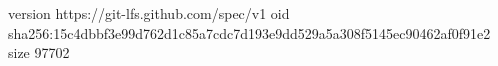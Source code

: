 version https://git-lfs.github.com/spec/v1
oid sha256:15c4dbbf3e99d762d1c85a7cdc7d193e9dd529a5a308f5145ec90462af0f91e2
size 97702
